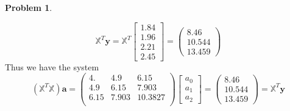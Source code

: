 \documentclass[10pt]{article}
\theoremstyle{plain}
\theoremstyle{definition}
\newtheorem{prob}{Problem}
\numberwithin{equation}{section}
\begin{document}
\begin{prob}
\begin{enumerate}[\bfseries(a)]
\[            \]
    \[
        \mathbb{X}^T \bm{y} = \mathbb{X}^T \begin{bmatrix} 1.84 \\ 1.96 \\ 2.21 \\ 2.45 \end{bmatrix}
        = \begin{pmatrix}8.46 \\  10.544 \\  13.459 \end{pmatrix}
        \]
    Thus we have the system
    \[
            \left(\mathbb{X}^T\mathbb{X}\right)\bm{a} = 
            \begin{pmatrix} 
            4.    &   4.9   &   6.15  \\
            4.9   &   6.15  &   7.903 \\
            6.15  &   7.903 &  10.3827\\
            \end{pmatrix} \begin{bmatrix} a_0 \\ a_1 \\ a_2 \end{bmatrix}
        = \begin{pmatrix}8.46 \\  10.544 \\  13.459 \end{pmatrix}
        = \mathbb{X}^T \bm{y}
    \]


\end{enumerate}
\end{prob}
\end{document}
